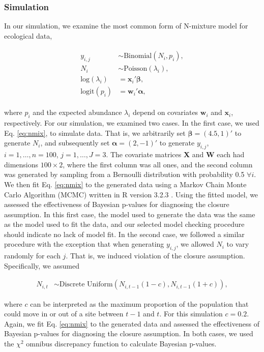 \documentclass[12pt,english]{article}
\begin{document}
\begin{spacing}{1.9}
\subsubsection*{Simulation}

In our simulation, we examine the most common form of N-mixture model
for ecological data,
\begin{linenomath}
  \begin{align}
    \begin{split}
      y_{i,j} & \sim \text{Binomial}(N_{i},p_i),\\
      N_{i} & \sim \text{Poisson}(\lambda_{i}), \\
      \text{log}(\lambda_i) & = \textbf{x}_i'\boldsymbol{\beta},
      \\
      \text{logit}(p_i) & = \textbf{w}_i'\boldsymbol{\alpha},
    \end{split}
                          \label{eq:nmix}
  \end{align}
\end{linenomath}
where $p_i$ and the expected abundance $\lambda_i$ depend on
covariates $\textbf{w}_i$ and $\textbf{x}_i$, respectively. For our
simulation, we examined two cases. In the first case, we used
Eq. \ref{eq:nmix}, to simulate data. That is, we arbitrarily set
$\boldsymbol{\beta}=(4.5,1)'$ to generate $N_i$, and subsequently set
$\boldsymbol{\alpha}=(2,-1)'$ to generate $y_{i,j}$,
$i=1,\ldots,n=100$, $j=1,\ldots,J=3$. The covariate matrices
\textbf{X} and \textbf{W} each had dimensions $100\times 2$, where the
first column was all ones, and the second column was generated by
sampling from a Bernoulli distribution with probability 0.5
$\forall i$. We then fit Eq. \ref{eq:nmix} to the generated data using
a Markov Chain Monte Carlo Algorithm (MCMC) written in R version 3.2.3
\citep{r323}. Using the fitted model, we assessed the effectiveness of
Bayesian p-values for diagnosing the closure assumption. In this first
case, the model used to generate the data was the same as the model
used to fit the data, and our selected model checking procedure should
indicate no lack of model fit. In the second case, we followed a
similar procedure with the exception that when generating $y_{i,j}$,
we allowed $N_i$ to vary randomly for each $j$. That is, we induced
violation of the closure assumption. Specifically, we assumed
\begin{linenomath}
  \begin{align}
    N_{i,t} & \sim \text{Discrete Uniform}(N_{i,t-1}(1-c), N_{i,t-1}(1+c)),
  \end{align}
\end{linenomath}
where $c$ can be interpreted as the maximum proportion of the
population that could move in or out of a site between $t-1$ and
$t$. For this simulation $c=0.2$. Again, we fit Eq. \ref{eq:nmix} to
the generated data and assessed the effectiveness of Bayesian p-values
for diagnosing the closure assumption. In both cases, we used the
$\chi^2$ omnibus discrepancy function to calculate Bayesian p-values.


\end{spacing}
\end{document}
